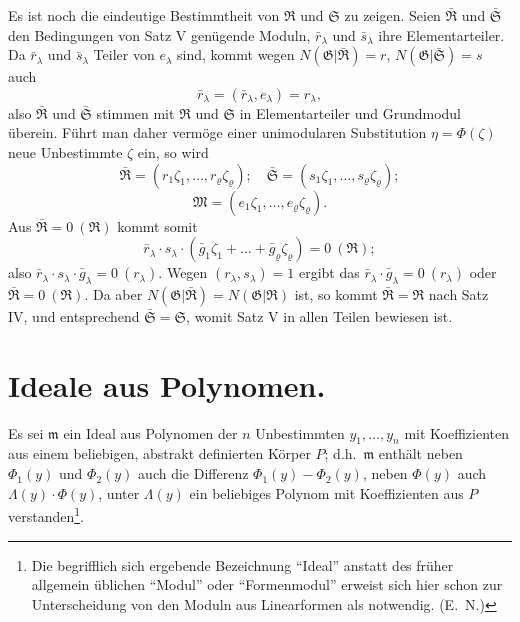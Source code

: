\documentclass[fontsize=10pt,paper=a5,pagesize,headings=small]{scrbook}
\newcommand{\ideal}[1]{\mathfrak{#1}}
\theoremstyle{plain}
\begin{document}
Es ist noch die eindeutige Bestimmtheit von $\mathfrak{R}$ und $\mathfrak{S}$ zu zeigen. Seien $\bar{\mathfrak{R}}$ und
$\bar{\mathfrak{S}}$ den Bedingungen von Satz V genügende Moduln, $\bar{r}_\lambda$ und $\bar{s}_\lambda$ ihre Elementarteiler.
Da $\bar{r}_\lambda$ und $\bar{s}_\lambda$ Teiler von $e_\lambda$ sind, kommt wegen $N(\mathfrak{G}|\bar{\mathfrak{R}}) = r$,
$N(\mathfrak{G}|\bar{\mathfrak{S}}) = s$ auch
\[ \bar{r}_\lambda = (\bar{r}_\lambda, e_\lambda) = r_\lambda, \]
also $\bar{\mathfrak{R}}$ und $\bar{\mathfrak{S}}$ stimmen mit $\mathfrak{R}$ und $\mathfrak{S}$ in Elementarteiler und Grundmodul überein.
Führt man daher vermöge einer unimodularen Substitution $\eta = \Phi(\zeta)$ neue
Unbestimmte $\zeta$ ein, so wird
\[ \bar{\mathfrak{R}} = (r_1\zeta_1,\dots,r_\varrho\zeta_\varrho);\quad \bar{\mathfrak{S}} = (s_1\zeta_1,\dots,s_\varrho\zeta_\varrho); \]
\[ \mathfrak{M} = (e_1\zeta_1,\dots,e_\varrho\zeta_\varrho). \]
Aus $\bar{\mathfrak{R}} = 0\ (\mathfrak{R})$ kommt somit
\[ \bar{r}_\lambda \cdot s_\lambda \cdot (\bar{g}_1\zeta_1 + \dots + \bar{g}_\varrho\zeta_\varrho) = 0\ (\mathfrak{R}); \]
also $\bar{r}_\lambda \cdot s_\lambda \cdot \bar{g}_\lambda = 0\ (r_\lambda)$. Wegen $(r_\lambda,s_\lambda) = 1$ ergibt das
$\bar{r}_\lambda \cdot \bar{g}_\lambda = 0\ (r_\lambda)$ oder $\bar{\mathfrak{R}} = 0\ (\mathfrak{R})$. Da aber
$N(\mathfrak{G}|\bar{\mathfrak{R}}) = N(\mathfrak{G}|\mathfrak{R})$ ist, so kommt $\bar{\mathfrak{R}} = \mathfrak{R}$ nach Satz IV, und entsprechend
$\bar{\mathfrak{S}} = \mathfrak{S}$, womit Satz V in allen Teilen bewiesen ist.

\section{Ideale aus Polynomen.}
\setcounter{section}{3}

Es sei $\ideal{m}$ ein Ideal aus Polynomen der $n$ Unbestimmten $y_1,\dots,y_n$ mit
Koeffizienten aus einem beliebigen, abstrakt definierten Körper $P$; d.h.~$\ideal{m}$
enthält neben $\Phi_1(y)$ und $\Phi_2(y)$ auch die Differenz $\Phi_1(y) - \Phi_2(y)$, neben
$\Phi(y)$ auch $\Lambda(y) \cdot \Phi(y)$, unter $\Lambda(y)$ ein beliebiges Polynom mit Koeffizienten
aus $P$ verstanden\footnote{Die begrifflich sich ergebende Bezeichnung ``Ideal'' anstatt
des früher allgemein üblichen ``Modul'' oder ``Formenmodul'' erweist sich hier schon zur
Unterscheidung von den Moduln aus Linearformen als notwendig. (E.~N.)}.
\end{document}
